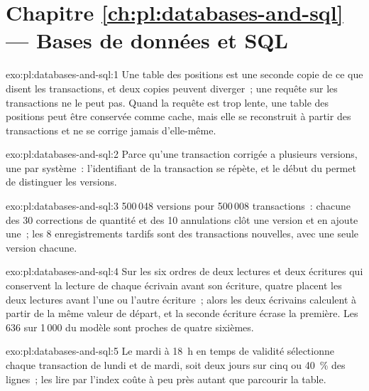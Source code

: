 \section*{Chapitre \ref{ch:pl:databases-and-sql} --- Bases de données et SQL}

\begin{solution}{exo:pl:databases-and-sql:1}
Une table des positions est une seconde copie de ce que disent les transactions, et deux copies peuvent diverger~; une requête sur les transactions ne le peut pas. Quand la requête est trop lente,
une table des positions peut être conservée comme cache, mais elle se reconstruit à partir des transactions et ne se corrige jamais d'elle-même.
\end{solution}

\begin{solution}{exo:pl:databases-and-sql:2}
Parce qu'une transaction corrigée a plusieurs versions, une par  système~: l'identifiant de la transaction se répète, et le début du 
permet de distinguer les versions.
\end{solution}

\begin{solution}{exo:pl:databases-and-sql:3}
500\,048 versions pour 500\,008 transactions~: chacune des 30 corrections de quantité et des 10 annulations clôt une version et en ajoute une~; les 8 enregistrements
tardifs sont des transactions nouvelles, avec une seule version chacune.
\end{solution}

\begin{solution}{exo:pl:databases-and-sql:4}
Sur les six ordres de deux lectures et deux écritures qui conservent la lecture de chaque écrivain avant son écriture, quatre placent les deux lectures avant l'une ou l'autre écriture~; alors
les deux écrivains calculent à partir de la même valeur de départ, et la seconde écriture écrase la première. Les 636 sur 1\,000 du modèle sont proches de quatre sixièmes.
\end{solution}

\begin{solution}{exo:pl:databases-and-sql:5}
Le mardi à 18~h en temps de validité sélectionne chaque transaction de lundi et de mardi, soit deux jours sur cinq ou 40~\% des lignes~; les lire par l'index
coûte à peu près autant que parcourir la table.
\end{solution}

